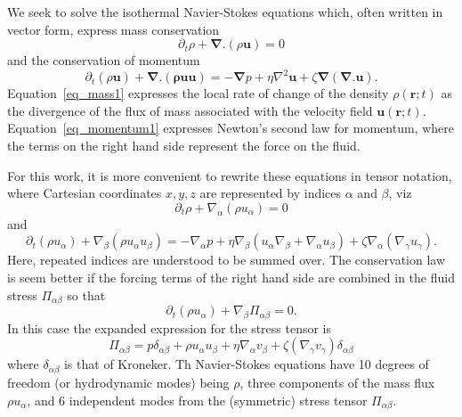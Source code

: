 We seek to solve the isothermal Navier-Stokes equations which, often
written in vector form, express mass conservation
\begin{equation}
\partial_t \rho + \boldsymbol{\nabla}.(\rho\mathbf{u}) = 0
\label{eq_mass1}
\end{equation}
and the conservation of momentum
\begin{equation}
\partial_t (\rho\mathbf{u}) + \boldsymbol{\nabla}.(\mathbf{\rho uu}) =
-\boldsymbol{\nabla}p + \eta \nabla^2 \mathbf{u}
+\zeta \boldsymbol{\nabla}(\boldsymbol{\nabla}.\mathbf{u}).
\label{eq_momentum1}
\end{equation}
Equation~\ref{eq_mass1} expresses the local rate of change of the
density $\rho(\mathbf{r}; t)$ as the divergence of the flux of
mass associated with the velocity field $\mathbf{u}(\mathbf{r}; t)$.
Equation~\ref{eq_momentum1} expresses Newton's second law for
momentum, where the terms on the right hand side represent the
force on the fluid.

For this work, it is more convenient to rewrite these equations
in tensor notation, where Cartesian coordinates ${x,y,z}$ are
represented by indices $\alpha$ and $\beta$, viz
\begin{equation}
\partial_t \rho + \nabla_\alpha (\rho u_\alpha) = 0
\end{equation}
and
\begin{equation}
\partial_t (\rho u_\alpha) + \nabla_\beta (\rho u_\alpha u_\beta)
= -\nabla_\alpha p
+  \eta \nabla_\beta (u_\alpha \nabla_\beta + \nabla_\alpha u_\beta)
+ \zeta \nabla_\alpha (\nabla_\gamma u_\gamma).
\end{equation}
Here, repeated indices are understood to be summed over.
The conservation law is seem better if the forcing terms of the
right hand side are combined in the fluid stress $\Pi_{\alpha\beta}$
so that
\begin{equation}
\partial_t (\rho u_\alpha) +\nabla_\beta \Pi_{\alpha\beta} = 0.
\end{equation}
In this case the expanded expression for the stress tensor is
\begin{equation}
\Pi_{\alpha\beta} = p \delta_{\alpha\beta} + \rho u_\alpha u_\beta 
+ \eta \nabla_\alpha v_\beta + \zeta (\nabla_\gamma v_\gamma)\delta_{\alpha\beta}
\end{equation}
where $\delta_{\alpha\beta}$ is that of Kroneker. Th Navier-Stokes
equations have 10 degrees of freedom (or hydrodynamic modes) being
$\rho$, three components of the mass flux $\rho u_\alpha$, and 6 independent
modes from the (symmetric) stress tensor $\Pi_{\alpha\beta}$.


